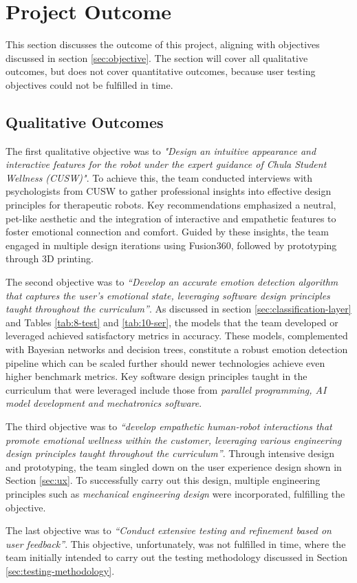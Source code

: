 \section{Project Outcome}
This section discusses the outcome of this project, aligning with objectives discussed in section \ref{sec:objective}. The section will cover all qualitative outcomes, but does not cover quantitative outcomes,  because user testing objectives could not be fulfilled in time. 

\subsection{Qualitative Outcomes}
The first qualitative objective was to \textit{"Design an intuitive appearance and interactive features for the robot under the expert guidance of Chula Student Wellness (CUSW)"}. To achieve this, the team conducted interviews with psychologists from CUSW to gather professional insights into effective design principles for therapeutic robots. Key recommendations emphasized a neutral, pet-like aesthetic and the integration of interactive and empathetic features to foster emotional connection and comfort. Guided by these insights, the team engaged in multiple design iterations using Fusion360, followed by prototyping through 3D printing. 

The second objective was to \textit{“Develop an accurate emotion detection algorithm that captures the user’s emotional state, leveraging software design principles taught throughout the curriculum”}. As discussed in section \ref{sec:classification-layer} and Tables \ref{tab:8-test} and \ref{tab:10-ser}, the models that the team developed or leveraged achieved satisfactory metrics in accuracy. These models, complemented with Bayesian networks and decision trees, constitute a robust emotion detection pipeline which can be scaled further should newer technologies achieve even higher benchmark metrics. Key software design principles taught in the curriculum that were leveraged include those from \textit{parallel programming, AI model development and mechatronics software}.

The third objective was to \textit{“develop empathetic human-robot interactions that promote emotional wellness within the customer, leveraging various engineering design principles taught throughout the curriculum”}. Through intensive design and prototyping, the team singled down on the user experience design shown in Section \ref{sec:ux}. To successfully carry out this design, multiple engineering principles such as \textit{mechanical engineering design} were incorporated, fulfilling the objective.

The last objective was to \textit{“Conduct extensive testing and refinement based on user feedback”}. This objective, unfortunately, was not fulfilled in time, where the team initially intended to carry out the testing methodology discussed in Section \ref{sec:testing-methodology}. 
